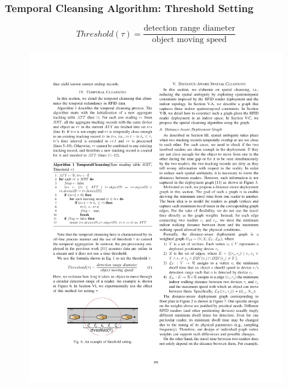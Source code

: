 
\begin{frame}
\frametitle{Temporal Cleansing Algorithm: Threshold Setting}

\begin{equation}
  Threshold(\tau) = \frac{\text{detection range diameter}}{\text{object moving speed}}
\end{equation}

\begin{figure}[tb]
  \includegraphics[width=0.7\columnwidth]{figures/3-2/3-2-8.pdf}
\end{figure}

\end{frame}


